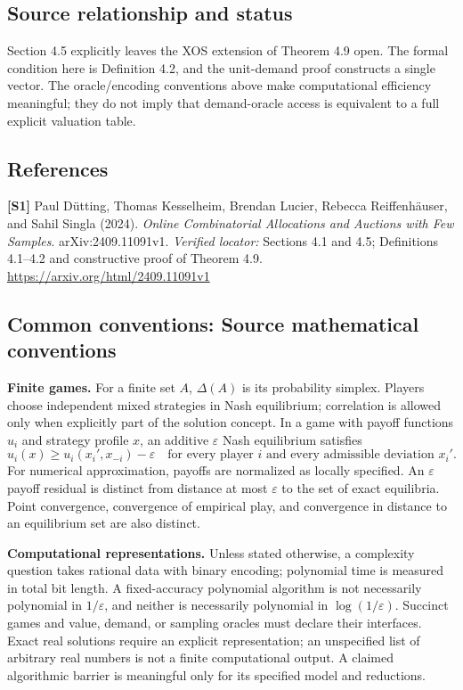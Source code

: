 \documentclass[11pt,a4paper]{article}
\begin{document}
\subsection*{Source relationship and status}
Section 4.5 explicitly leaves the XOS extension of Theorem 4.9 open. The formal condition here is Definition 4.2, and the unit-demand proof constructs a single vector. The oracle/encoding conventions above make computational efficiency meaningful; they do not imply that demand-oracle access is equivalent to a full explicit valuation table.
\subsection*{References}
\begingroup\footnotesize\raggedright
\textbf{[S1]} Paul D\"utting, Thomas Kesselheim, Brendan Lucier, Rebecca Reiffenhäuser, and Sahil Singla (2024). \emph{Online Combinatorial Allocations and Auctions with Few Samples}. arXiv:2409.11091v1. \textit{Verified locator:} Sections 4.1 and 4.5; Definitions 4.1--4.2 and constructive proof of Theorem 4.9. \url{https://arxiv.org/html/2409.11091v1}
\par\endgroup

\subsection*{Common conventions: Source mathematical conventions}

\textbf{Finite games.} For a finite set $A$, $\Delta(A)$ is its probability
simplex. Players choose independent mixed strategies in Nash equilibrium;
correlation is allowed only when explicitly part of the solution concept.
In a game with payoff functions $u_i$ and strategy profile $x$, an additive
$\varepsilon$ Nash equilibrium satisfies
\[
 u_i(x)\geq u_i(x_i',x_{-i})-\varepsilon
 \quad\text{for every player $i$ and every admissible deviation $x_i'$}.
\]
For numerical approximation, payoffs are normalized as locally specified.
An $\varepsilon$ payoff residual is distinct from distance at most
$\varepsilon$ to the set of exact equilibria. Point convergence, convergence
of empirical play, and convergence in distance to an equilibrium set are
also distinct.

\textbf{Computational representations.} Unless stated otherwise, a complexity
question takes rational data with binary encoding; polynomial time is measured
in total bit length. A fixed-accuracy polynomial algorithm is not necessarily
polynomial in $1/\varepsilon$, and neither is necessarily polynomial in
$\log(1/\varepsilon)$. Succinct games and value, demand, or sampling oracles
must declare their interfaces. Exact real solutions require an explicit
representation; an unspecified list of arbitrary real numbers is not a
finite computational output. A claimed algorithmic barrier is meaningful
only for its specified model and reductions.
\end{document}
